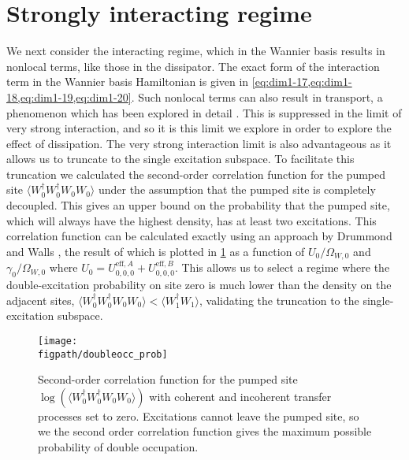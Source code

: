 \section{Strongly interacting regime}
We next consider the interacting regime, which in the Wannier basis results in nonlocal terms, like those in the dissipator. The exact form of the interaction term in the Wannier basis Hamiltonian is given in \cref{eq:dim1-17,eq:dim1-18,eq:dim1-19,eq:dim1-20}. Such nonlocal terms can also result in transport, a phenomenon which has been explored in detail \cite{Huber2010,Tovmasyan2013,Takayoshi2013,Phillips2015,Pudleiner2015}. This is suppressed in the limit of very strong interaction, and so it is this limit we explore in order to explore the effect of dissipation. The very strong interaction limit is also advantageous as it allows us to truncate to the single excitation subspace. To facilitate this truncation we calculated the second-order correlation function for the pumped site \(\langle W_{0}^{\dagger}W_{0}^{\dagger}W_{0}W_{0} \rangle\) under the assumption that the pumped site is completely decoupled. This gives an upper bound on the probability that the pumped site, which will always have the highest density, has at least two excitations. This correlation function can be calculated exactly using an approach by Drummond and Walls \cite{Drummond1980,LeBoite2013}, the result of which is plotted in \cref{fig:dim3-1} as a function of \(U_{0}/\Omega_{W,0}\) and \(\gamma_{0}/\Omega_{W,0}\) where \(U_{0} = U_{0,0,0}^{\mathrm{eff},A} + U_{0,0,0}^{\mathrm{eff},B}\). This allows us to select a regime where the double-excitation probability on site zero is much lower than the density on the adjacent sites, \(\langle W_{0}^{\dagger}W_{0}^{\dagger}W_{0}W_{0} \rangle < \langle W_{1}^{\dagger}W_{1} \rangle\), validating the truncation to the single-excitation subspace.

\begin{figure}[ht!]
\centering 
\texttt{[image: \\figpath/doubleocc\_prob]}
\caption{\label{fig:dim3-1}Second-order correlation function for the pumped site \(\log(\langle W_{0}^{\dagger}W_{0}^{\dagger}W_{0}W_{0}\rangle )\) with coherent and incoherent transfer processes set to zero. Excitations cannot leave the pumped site, so we the second order correlation function gives the maximum possible probability of double occupation.}
\end{figure}

